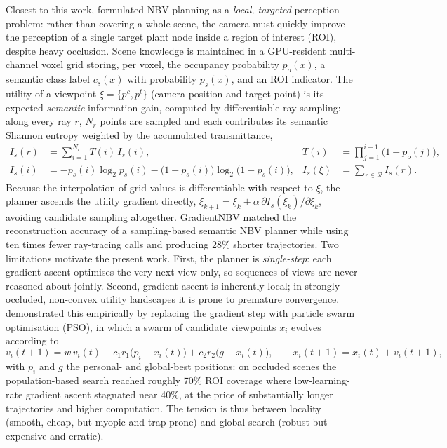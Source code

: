 Closest to this work, \textcite{burusa2024} formulated NBV planning as a
\emph{local, targeted} perception problem: rather than covering a whole
scene, the camera must quickly improve the perception of a single target
plant node inside a region of interest (ROI), despite heavy occlusion.
Scene knowledge is maintained in a GPU-resident multi-channel voxel grid
storing, per voxel, the occupancy probability $p_o(x)$, a semantic class
label $c_s(x)$ with probability $p_s(x)$, and an ROI indicator. The
utility of a viewpoint $\xi = \{p^c, p^t\}$ (camera position and target
point) is its expected \emph{semantic} information gain, computed by
differentiable ray sampling: along every ray $r$, $N_r$ points are
sampled and each contributes its semantic Shannon entropy weighted by
the accumulated transmittance,
%
\begin{align}
  I_s(r) &= \sum_{i=1}^{N_r} T(i)\, I_s(i),
  &
  T(i) &= \prod_{j=1}^{i-1}\bigl(1 - p_o(j)\bigr),
  \label{eq:rw-burusa-ray}
  \\
  I_s(i) &= -p_s(i)\log_2 p_s(i) - \bigl(1-p_s(i)\bigr)\log_2\bigl(1-p_s(i)\bigr),
  &
  I_s(\xi) &= \sum_{r \in \mathcal{R}} I_s(r).
  \label{eq:rw-burusa-utility}
\end{align}
%
Because the interpolation of grid values is differentiable with respect
to $\xi$, the planner ascends the utility gradient directly,
$\xi_{k+1} = \xi_k + \alpha\, \partial I_s(\xi_k)/\partial \xi_k$,
avoiding candidate sampling altogether. GradientNBV matched the
reconstruction accuracy of a sampling-based semantic NBV planner while
using ten times fewer ray-tracing calls and producing 28\% shorter
trajectories. Two limitations motivate the present work. First, the
planner is \emph{single-step}: each gradient ascent optimises the very
next view only, so sequences of views are never reasoned about jointly.
Second, gradient ascent is inherently local; in strongly occluded,
non-convex utility landscapes it is prone to premature convergence.
\textcite{verlinden2024pso} demonstrated this empirically by replacing
the gradient step with particle swarm optimisation (PSO), in which a
swarm of candidate viewpoints $x_i$ evolves according to
%
\begin{equation}
  v_i(t+1) = w\,v_i(t) + c_1 r_1 \bigl(p_i - x_i(t)\bigr)
                       + c_2 r_2 \bigl(g - x_i(t)\bigr),
  \qquad
  x_i(t+1) = x_i(t) + v_i(t+1),
  \label{eq:rw-pso}
\end{equation}
%
with $p_i$ and $g$ the personal- and global-best positions: on occluded
scenes the population-based search reached roughly 70\% ROI coverage
where low-learning-rate gradient ascent stagnated near 40\%, at the
price of substantially longer trajectories and higher computation. The
tension is thus between locality (smooth, cheap, but myopic and
trap-prone) and global search (robust but expensive and erratic).

